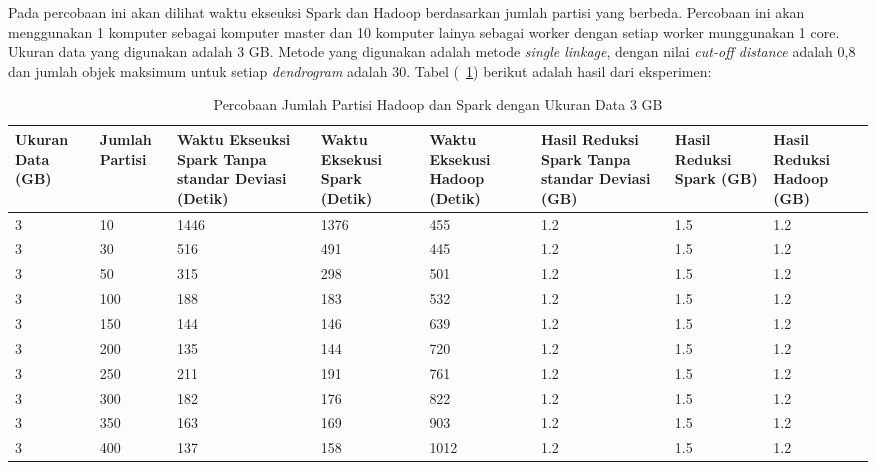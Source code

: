 

Pada percobaan ini akan dilihat waktu ekseuksi Spark dan Hadoop berdasarkan jumlah partisi yang berbeda. Percobaan ini akan menggunakan 1 komputer sebagai komputer master dan 10 komputer lainya sebagai worker dengan setiap worker munggunakan 1 core. Ukuran data yang digunakan adalah 3 GB. Metode yang digunakan adalah metode \textit{single linkage}, dengan nilai \textit{cut-off distance} adalah 0,8 dan jumlah objek maksimum untuk setiap \textit{dendrogram} adalah 30. Tabel (~\ref{tab:spark3}) berikut adalah hasil dari eksperimen:

\begin{table}[H] 
	\centering 
	\caption{Percobaan Jumlah Partisi Hadoop dan Spark dengan Ukuran Data 3 GB}
	\label{tab:spark3}
	\begin{tabular}{|p{1cm}|p{1cm}|p{2cm}|p{2cm}|p{2cm}|p{2cm}|p{2cm}|p{2cm}|}
\hline
Ukuran Data (GB) & Jumlah Partisi &  Waktu Ekseuksi Spark Tanpa standar Deviasi (Detik) & Waktu Eksekusi Spark (Detik) & Waktu Eksekusi Hadoop (Detik) & Hasil Reduksi Spark Tanpa standar Deviasi (GB) & Hasil Reduksi Spark (GB)  & Hasil Reduksi Hadoop (GB)\\ 
\hline
3 & 10 & 1446 & 1376 & 455 & 1.2 & 1.5 & 1.2 \\
\hline
3 & 30 & 516 & 491 & 445 & 1.2 & 1.5 & 1.2 \\
\hline
3 & 50 & 315 & 298 & 501 & 1.2 & 1.5 & 1.2 \\
\hline
3 & 100 & 188 & 183 & 532 & 1.2 & 1.5 & 1.2 \\
\hline
3 & 150 & 144 & 146 & 639 & 1.2 & 1.5 & 1.2 \\
\hline
3 & 200 & 135 & 144 & 720 & 1.2 & 1.5 & 1.2 \\
\hline
3 & 250 & 211 & 191 & 761 & 1.2 & 1.5 & 1.2 \\
\hline
3 & 300 & 182 & 176 & 822 & 1.2 & 1.5 & 1.2 \\
\hline
3 & 350 & 163 & 169 & 903 & 1.2 & 1.5 & 1.2 \\
\hline
3 & 400 & 137 & 158 & 1012 & 1.2 & 1.5 & 1.2 \\
\hline


\hline

	\end{tabular} 
\end{table}



\def\scl{1}

\def\leg{} 
\def\std{none}
\def\ymin{}
\def\ymax{}

